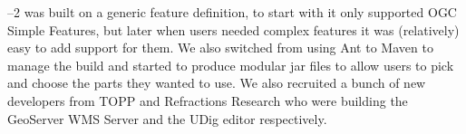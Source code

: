\GeoTools--2 was built on a generic feature definition, to start with it only supported \ac{OGC} Simple Features, but later when users needed complex features it was (relatively) easy to add support for them. We also switched from using Ant to Maven to manage the build and started to produce modular jar files to allow users to pick and choose the parts they wanted to use. We also recruited a bunch of new developers from \ac{TOPP} and Refractions Research who were building the GeoServer WMS Server and the UDig editor respectively. 